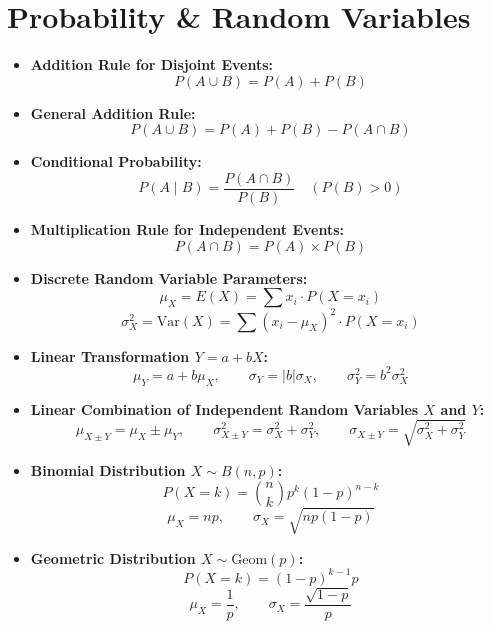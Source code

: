 \section{Probability \& Random Variables}
\begin{itemize}[leftmargin=1.5em]
  \item \textbf{Addition Rule for Disjoint Events:}
  \[ P(A \cup B) = P(A) + P(B) \]
  \item \textbf{General Addition Rule:}
  \[ P(A \cup B) = P(A) + P(B) - P(A \cap B) \]
  \item \textbf{Conditional Probability:}
  \[ P(A \mid B) = \frac{P(A \cap B)}{P(B)} \quad (P(B) > 0) \]
  \item \textbf{Multiplication Rule for Independent Events:}
  \[ P(A \cap B) = P(A) \times P(B) \]
  \item \textbf{Discrete Random Variable Parameters:}
  \[ \mu_X = E(X) = \sum x_i \cdot P(X = x_i) \]
  \[ \sigma_X^2 = \text{Var}(X) = \sum (x_i - \mu_X)^2 \cdot P(X = x_i) \]
  \item \textbf{Linear Transformation $Y = a + bX$:}
  \[ \mu_Y = a + b\mu_X, \qquad \sigma_Y = |b|\sigma_X, \qquad \sigma_Y^2 = b^2\sigma_X^2 \]
  \item \textbf{Linear Combination of Independent Random Variables $X$ and $Y$:}
  \[ \mu_{X \pm Y} = \mu_X \pm \mu_Y, \qquad \sigma_{X \pm Y}^2 = \sigma_X^2 + \sigma_Y^2, \qquad \sigma_{X \pm Y} = \sqrt{\sigma_X^2 + \sigma_Y^2} \]
  \item \textbf{Binomial Distribution $X \sim B(n, p)$:}
  \[ P(X = k) = \binom{n}{k} p^k (1 - p)^{n - k} \]
  \[ \mu_X = np, \qquad \sigma_X = \sqrt{np(1 - p)} \]
  \item \textbf{Geometric Distribution $X \sim \text{Geom}(p)$:}
  \[ P(X = k) = (1 - p)^{k - 1} p \]
  \[ \mu_X = \frac{1}{p}, \qquad \sigma_X = \frac{\sqrt{1 - p}}{p} \]
\end{itemize}

